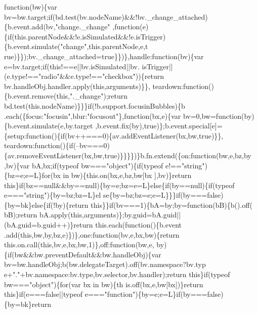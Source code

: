 \begin{DoxyCode}
{      function}(bw)\{var bv=bw.target;if(bd.test(bv.nodeName)&&!bv.\_change\_attached)\{b.event.add(bv,\textcolor{stringliteral}{"change.\_change"}
      ,function(e)\{if(this.parentNode&&!e.isSimulated&&!e.isTrigger)\{b.event.simulate(\textcolor{stringliteral}{"change"},this.parentNode,e,t
      rue)\}\});bv.\_change\_attached=true\}\})\},handle:\textcolor{keyword}{function}(bv)\{var e=bv.target;\textcolor{keywordflow}{if}(\textcolor{keyword}{this}!==e||bv.isSimulated||bv.
      isTrigger||(e.type!==\textcolor{stringliteral}{"radio"}&&e.type!==\textcolor{stringliteral}{"checkbox"}))\{\textcolor{keywordflow}{return} bv.handleObj.handler.apply(\textcolor{keyword}{this},arguments)\}\},
      teardown:\textcolor{keyword}{function}()\{b.event.remove(\textcolor{keyword}{this},\textcolor{stringliteral}{".\_change"});\textcolor{keywordflow}{return} bd.test(this.nodeName)\}\}\}\textcolor{keywordflow}{if}(!b.support.focusinBubbles)\{b
      .each(\{focus:\textcolor{stringliteral}{"focusin"},blur:\textcolor{stringliteral}{"focusout"}\},\textcolor{keyword}{function}(bx,e)\{var bv=0,bw=\textcolor{keyword}{function}(by)\{b.event.simulate(e,by.target
      ,b.event.fix(by),\textcolor{keyword}{true})\};b.event.special[e]=\{setup:\textcolor{keyword}{function}()\{\textcolor{keywordflow}{if}(bv++===0)\{av.addEventListener(bx,bw,\textcolor{keyword}{true})\}\},
      teardown:\textcolor{keyword}{function}()\{\textcolor{keywordflow}{if}(--bv===0)\{av.removeEventListener(bx,bw,\textcolor{keyword}{true})\}\}\}\})\}b.fn.extend(\{on:function(bw,e,bz,by
      ,bv)\{var bA,bx;if(typeof bw===\textcolor{stringliteral}{"object"})\{if(typeof e!==\textcolor{stringliteral}{"string"})\{bz=e;e=L\}for(bx in bw)\{this.on(bx,e,bz,bw[bx
      ],bv)\}return this\}if(bz==null&&by==null)\{by=e;bz=e=L\}else\{if(by==null)\{if(typeof e===\textcolor{stringliteral}{"string"})\{by=bz;bz=L\}el
      se\{by=bz;bz=e;e=L\}\}\}if(by===false)\{by=bk\}else\{if(!by)\{return this\}\}if(bv===1)\{bA=by;by=function(bB)\{b().off(
      bB);return bA.apply(this,arguments)\};by.guid=bA.guid||(bA.guid=b.guid++)\}return this.each(function()\{b.event
      .add(this,bw,by,bz,e)\})\},one:\textcolor{keyword}{function}(bv,e,bx,bw)\{return this.on.call(this,bv,e,bx,bw,1)\},off:\textcolor{keyword}{function}(bw,e,
      by)\{if(bw&&bw.preventDefault&&bw.handleObj)\{var bv=bw.handleObj;b(bw.delegateTarget).off(bv.namespace?bv.typ
      e+\textcolor{stringliteral}{"."}+bv.namespace:bv.type,bv.selector,bv.handler);return this\}\textcolor{keywordflow}{if}(typeof bw===\textcolor{stringliteral}{"object"})\{for(var bx in bw)\{th
      is.off(bx,e,bw[bx])\}\textcolor{keywordflow}{return} \textcolor{keyword}{this}\}\textcolor{keywordflow}{if}(e===\textcolor{keyword}{false}||typeof e===\textcolor{stringliteral}{"function"})\{by=e;e=L\}\textcolor{keywordflow}{if}(by===\textcolor{keyword}{false})\{by=bk\}\textcolor{keywordflow}{return} 

\end{DoxyCode}
